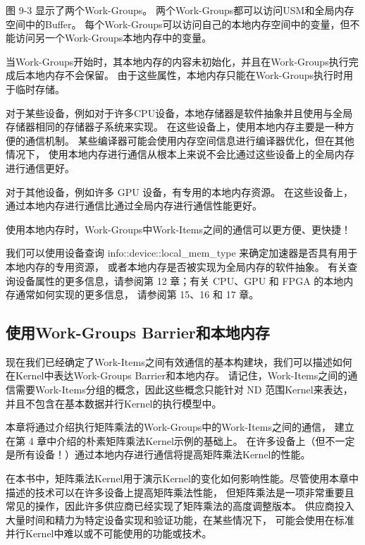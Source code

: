 图 9-3 显示了两个Work-Groups。 两个Work-Groups都可以访问USM和全局内存空间中的Buffer。 
每个Work-Groups可以访问自己的本地内存空间中的变量，但不能访问另一个Work-Groups本地内存中的变量。

当Work-Groups开始时，其本地内存的内容未初始化，并且在Work-Groups执行完成后本地内存不会保留。 
由于这些属性，本地内存只能在Work-Groups执行时用于临时存储。

对于某些设备，例如对于许多CPU设备，本地存储器是软件抽象并且使用与全局存储器相同的存储器子系统来实现。 
在这些设备上，使用本地内存主要是一种方便的通信机制。 
某些编译器可能会使用内存空间信息进行编译器优化，但在其他情况下，
使用本地内存进行通信从根本上来说不会比通过这些设备上的全局内存进行通信更好。

对于其他设备，例如许多 GPU 设备，有专用的本地内存资源。 
在这些设备上，通过本地内存进行通信比通过全局内存进行通信性能更好。

\begin{remark}
	使用本地内存时，Work-Groups中Work-Items之间的通信可以更方便、更快捷！
\end{remark}

我们可以使用设备查询 info::device::local\_mem\_type 来确定加速器是否具有用于本地内存的专用资源，
或者本地内存是否被实现为全局内存的软件抽象。 
有关查询设备属性的更多信息，请参阅第 12 章；有关 CPU、GPU 和 FPGA 的本地内存通常如何实现的更多信息，
请参阅第 15、16 和 17 章。

\subsection{使用Work-Groups Barrier和本地内存}
现在我们已经确定了Work-Items之间有效通信的基本构建块，我们可以描述如何在Kernel中表达Work-Groups Barrier和本地内存。 
请记住，Work-Items之间的通信需要Work-Items分组的概念，因此这些概念只能针对 ND 范围Kernel来表达，
并且不包含在基本数据并行Kernel的执行模型中。

本章将通过介绍执行矩阵乘法的Work-Groups中的Work-Items之间的通信，
建立在第 4 章中介绍的朴素矩阵乘法Kernel示例的基础上。 
在许多设备上（但不一定是所有设备！）通过本地内存进行通信将提高矩阵乘法Kernel的性能。

\begin{remark}[关于矩阵乘法的说明]
在本书中，矩阵乘法Kernel用于演示Kernel的变化如何影响性能。尽管使用本章中描述的技术可以在许多设备上提高矩阵乘法性能，
但矩阵乘法是一项非常重要且常见的操作，因此许多供应商已经实现了矩阵乘法的高度调整版本。
供应商投入大量时间和精力为特定设备实现和验证功能，在某些情况下，
可能会使用在标准并行Kernel中难以或不可能使用的功能或技术。
\end{remark}

